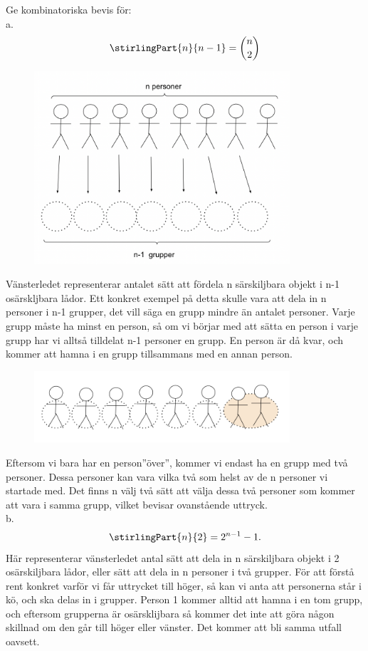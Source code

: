 \documentclass[nobib]{tufte-handout}
\begin{document}
\newpage
\begin{xca2}
 Ge kombinatoriska bevis för:\\
 a.
  $$\stirlingPart{n}{n-1} = \binom{n}{2}$$


\begin{figure}[h]
\includegraphics[width=95mm]{ovning_2a.1.png}
\end{figure}

 Vänsterledet representerar antalet sätt att fördela n särskiljbara objekt i n-1 osärskljbara lådor. Ett konkret exempel på detta skulle vara att dela in n personer i n-1 grupper, det vill säga en grupp mindre än antalet personer. Varje grupp måste ha minst en person, så om vi börjar med att sätta en person i varje grupp har vi alltså tilldelat n-1 personer en grupp. En person är då kvar, och kommer att hamna i en grupp tillsammans med en annan person.\\

\begin{figure}[h]
\includegraphics[width=95mm]{ovning_2a.2.png}
\end{figure}

Eftersom vi bara har en person”över”, kommer vi endast ha en grupp med två personer. Dessa personer kan vara vilka två som helst av de n personer vi startade med.  Det finns n välj två sätt att välja dessa två personer som kommer att vara i samma grupp, vilket bevisar ovanstående uttryck.\\
\bigskip 
 b. $$\stirlingPart{n}{2} = 2^{n-1} - 1.$$
Här representerar vänsterledet antal sätt att dela in n särskiljbara objekt i 2 osärskiljbara lådor, eller sätt att dela in n personer i två grupper. För att förstå rent konkret varför vi får uttrycket till höger, så kan vi anta att personerna står i kö, och ska delas in i grupper. Person 1 kommer alltid att hamna i en tom grupp, och eftersom grupperna är osärsklijbara så kommer det inte att göra någon skillnad om den går till höger eller vänster. Det kommer att bli samma utfall oavsett.



\end{xca2}
\end{document}
